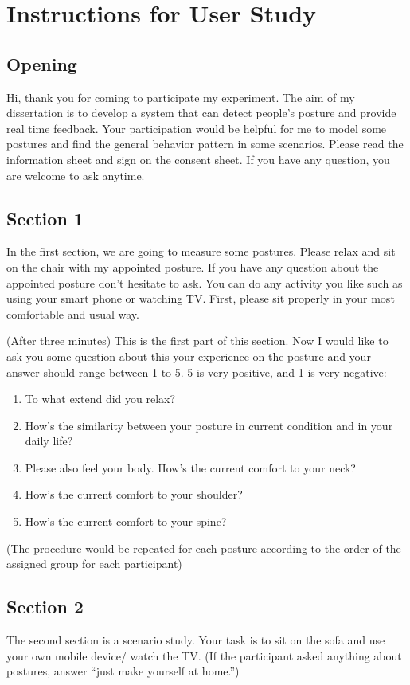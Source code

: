 \chapter{Instructions for User Study}
\label{appendix:instructions}

\section{Opening}
Hi, thank you for coming to participate my experiment. The aim of my dissertation is to develop a system that can detect people’s posture and provide real time feedback. Your participation would be helpful for me to model some postures and find the general behavior pattern in some scenarios. Please read the information sheet and sign on the consent sheet. If you have any question, you are welcome to ask anytime.

\section{Section 1}
In the first section, we are going to measure some postures. Please relax and sit on the chair with my appointed posture. If you have any question about the appointed posture don’t hesitate to ask. You can do any activity you like such as using your smart phone or watching TV. First, please sit properly in your most comfortable and usual way.

(After three minutes) This is the first part of this section. Now I would like to ask you some question about this your experience on the posture and your answer should range between 1 to 5. 5 is very positive, and 1 is very negative:

\begin{enumerate}
  \item To what extend did you relax?
  \item How's the similarity between your posture in current condition and in your daily life?
  \item Please also feel your body. How’s the current comfort to your neck?
  \item How’s the current comfort to your shoulder?
  \item How’s the current comfort to your spine?
\end{enumerate}

(The procedure would be repeated for each posture according to the order of the assigned group for each participant)

\section{Section 2}
The second section is a scenario study. Your task is to sit on the sofa and use your own mobile device/ watch the TV. (If the participant asked anything about postures, answer ``just make yourself at home.'')


